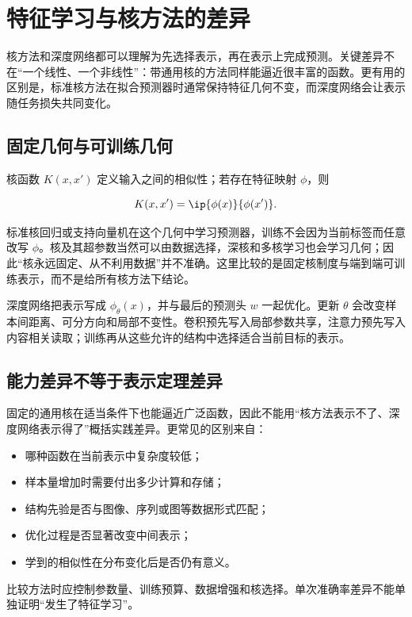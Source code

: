 \section{特征学习与核方法的差异}
\label{sec:14-Deep-Learning/07-Interpretability-Mathematics/02}

核方法和深度网络都可以理解为先选择表示，再在表示上完成预测。关键差异不在``一个线性、一个非线性''：带通用核的方法同样能逼近很丰富的函数。更有用的区别是，标准核方法在拟合预测器时通常保持特征几何不变，而深度网络会让表示随任务损失共同变化。


\subsection{固定几何与可训练几何}

核函数 \(K(x,x')\) 定义输入之间的相似性；若存在特征映射 \(\phi\)，则

\[
K(x,x')=\ip{\phi(x)}{\phi(x')}.
\]

标准核回归或支持向量机在这个几何中学习预测器，训练不会因为当前标签而任意改写 \(\phi\)。核及其超参数当然可以由数据选择，深核和多核学习也会学习几何；因此``核永远固定、从不利用数据''并不准确。这里比较的是固定核制度与端到端可训练表示，而不是给所有核方法下结论。

深度网络把表示写成 \(\phi_\theta(x)\)，并与最后的预测头 \(w\) 一起优化。更新 \(\theta\) 会改变样本间距离、可分方向和局部不变性。卷积预先写入局部参数共享，注意力预先写入内容相关读取；训练再从这些允许的结构中选择适合当前目标的表示。

\subsection{能力差异不等于表示定理差异}

固定的通用核在适当条件下也能逼近广泛函数，因此不能用``核方法表示不了、深度网络表示得了''概括实践差异。更常见的区别来自：

\begin{itemize}
\tightlist
\item 哪种函数在当前表示中复杂度较低；
\item 样本量增加时需要付出多少计算和存储；
\item 结构先验是否与图像、序列或图等数据形式匹配；
\item 优化过程是否显著改变中间表示；
\item 学到的相似性在分布变化后是否仍有意义。
\end{itemize}

比较方法时应控制参数量、训练预算、数据增强和核选择。单次准确率差异不能单独证明``发生了特征学习''。

